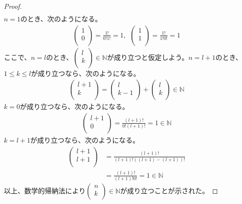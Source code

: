 \documentclass[dvipdfmx]{jsarticle}
\begin{document}
\begin{proof}
\begin{align*}
\end{align*}
$n = 1$のとき、次のようになる。
\begin{align*}
\begin{pmatrix}
1 \\
0 \\
\end{pmatrix} = \frac{1!}{0!1!} = 1,\ \ \begin{pmatrix}
1 \\
1 \\
\end{pmatrix} = \frac{1!}{1!0!} = 1
\end{align*}
ここで、$n = l$のとき、$\begin{pmatrix}
l \\
k \\
\end{pmatrix} \in \mathbb{N}$が成り立つと仮定しよう。$n = l + 1$のとき、$1 \leq k \leq l$が成り立つなら、次のようになる。
\begin{align*}
\begin{pmatrix}
l + 1 \\
k \\
\end{pmatrix} = \begin{pmatrix}
l \\
k - 1 \\
\end{pmatrix} + \begin{pmatrix}
l \\
k \\
\end{pmatrix} \in \mathbb{N}
\end{align*}
$k = 0$が成り立つなら、次のようになる。
\begin{align*}
\begin{pmatrix}
l + 1 \\
0 \\
\end{pmatrix} = \frac{(l + 1)!}{0!(l + 1)!} = 1 \in \mathbb{N}
\end{align*}
$k = l + 1$が成り立つなら、次のようになる。
\begin{align*}
\begin{pmatrix}
l + 1 \\
l + 1 \\
\end{pmatrix} &= \frac{(l + 1)!}{(l + 1)!\left( (l + 1) - (l + 1) \right)!}\\
&= \frac{(l + 1)!}{(l + 1)!0!} = 1 \in \mathbb{N}
\end{align*}
以上、数学的帰納法により$\begin{pmatrix}
n \\
k \\
\end{pmatrix} \in \mathbb{N}$が成り立つことが示された。
\end{proof}
\end{document}

